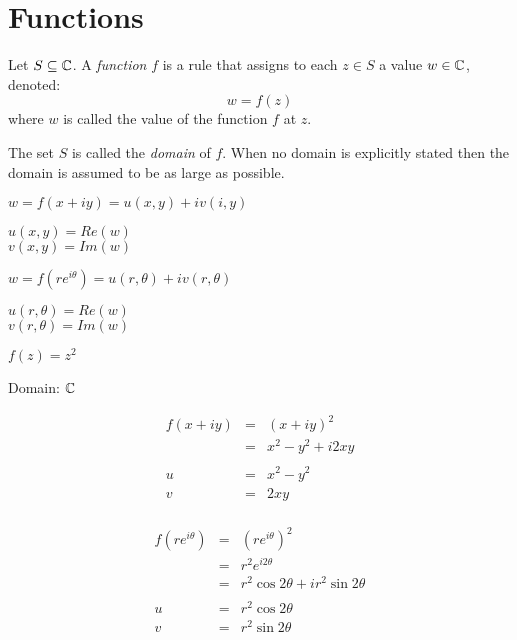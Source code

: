\documentclass[letterpaper,12pt,fleqn]{article}
\renewcommand{\o}{\theta}
\begin{document}
\section*{Functions}

\begin{definition}
  Let $S\subseteq\mathbb{C}$. A \emph{function} $f$ is a rule that assigns to each
  $z\in S$ a value $w\in\mathbb{C}$, denoted:
  \[w=f(z)\]
  where $w$ is called the value of the function $f$ at $z$.

  The set $S$ is called the \emph{domain} of $f$. When no domain is explicitly
  stated then the domain is assumed to be as large as possible.
\end{definition}

\begin{minipage}[t]{3in}
  $w=f(x+iy)=u(x,y)+iv(i,y)$

  $u(x,y)=Re(w)$ \\
  $v(x,y)=Im(w)$
\end{minipage}
\begin{minipage}[t]{3in}
  $w=f(re^{i\o})=u(r,\o)+iv(r,\o)$

  $u(r,\o)=Re(w)$ \\
  $v(r,\o)=Im(w)$
\end{minipage}

\begin{example}
  $f(z)=z^2$
  
  Domain: $\mathbb{C}$ \\
  \begin{minipage}[t]{3in}
    \begin{eqnarray*}
      f(x+iy) &=& (x+iy)^2 \\
      &=& x^2-y^2+i2xy \\
      \\
      u &=& x^2-y^2 \\
      v &=& 2xy \\
    \end{eqnarray*}
  \end{minipage}
  \begin{minipage}[t]{3in}
    \begin{eqnarray*}
      f(re^{i\o}) &=& (re^{i\o})^2 \\
      &=& r^2e^{i2\o} \\
      &=& r^2\cos{2\o}+ir^2\sin{2\o} \\
      \\
      u &=& r^2\cos{2\o} \\
      v &=& r^2\sin{2\o} \\
    \end{eqnarray*}
  \end{minipage}
\end{example}
\end{document}
